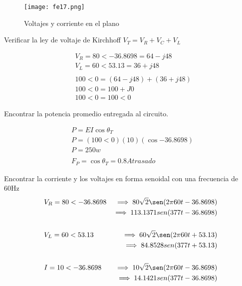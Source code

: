 \begin{enumerate}
	      \begin{figure}[h!]
		      \centering
		      \texttt{[image: fe17.png]}
		      \caption{Voltajes y corriente en el plano}
		      \label{f2}
	      \end{figure}

	      Verificar la ley de voltaje de Kirchhoff $V_T=V_R+V_C+V_L$

	      \begin{align*}
		       & V_R=80<-36.8698=64-j48  \\
		       & V_L=60<53.13=36+j48     \\\\\
		       & 100<0=(64-j48)+(36+j48) \\
		       & 100<0=100+J0            \\
		       & 100<0=100<0
	      \end{align*}

	      Encontrar la potencia promedio entregada al circuito.

	      \begin{align*}
		       & P=E I\cos{\theta_T}              \\
		       & P=(100<0)(10)(\cos{-36.8698})    \\
		       & P= 250 w                         \\\\
		       & F_P=\cos{\theta_T}= 0.8 Atrasado
	      \end{align*}

	      Encontrar la corriente y los voltajes en forma senoidal con una frecuencia de 60Hz
	      \begin{align*}
		       & V_R=80<-36.8698 & \implies 80\sqrt{2}\sen(2\pi60t-36.8698) \\
		       &                 & \implies113.1371sen(377t-36.8698)        \\\\\
		       & V_L=60<53.13    & \implies 60\sqrt{2}\sen(2\pi60t+53.13)   \\
		       &                 & \implies84.8528sen(377t+53.13)           \\\\\
		       & I=10<-36.8698   & \implies 10\sqrt{2}\sen(2\pi60t-36.8698) \\
		       &                 & \implies14.1421sen(377t-36.8698)         \\\\\
	      \end{align*}


\end{enumerate}
